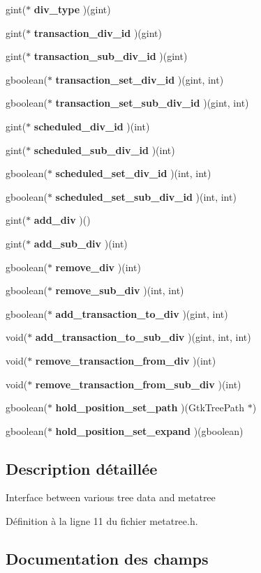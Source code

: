 \begin{DoxyCompactItemize}
gint($\ast$ {\bf div\_\-type} )(gint)
\item 
gint($\ast$ {\bf transaction\_\-div\_\-id} )(gint)
\item 
gint($\ast$ {\bf transaction\_\-sub\_\-div\_\-id} )(gint)
\item 
gboolean($\ast$ {\bf transaction\_\-set\_\-div\_\-id} )(gint, int)
\item 
gboolean($\ast$ {\bf transaction\_\-set\_\-sub\_\-div\_\-id} )(gint, int)
\item 
gint($\ast$ {\bf scheduled\_\-div\_\-id} )(int)
\item 
gint($\ast$ {\bf scheduled\_\-sub\_\-div\_\-id} )(int)
\item 
gboolean($\ast$ {\bf scheduled\_\-set\_\-div\_\-id} )(int, int)
\item 
gboolean($\ast$ {\bf scheduled\_\-set\_\-sub\_\-div\_\-id} )(int, int)
\item 
gint($\ast$ {\bf add\_\-div} )()
\item 
gint($\ast$ {\bf add\_\-sub\_\-div} )(int)
\item 
gboolean($\ast$ {\bf remove\_\-div} )(int)
\item 
gboolean($\ast$ {\bf remove\_\-sub\_\-div} )(int, int)
\item 
gboolean($\ast$ {\bf add\_\-transaction\_\-to\_\-div} )(gint, int)
\item 
void($\ast$ {\bf add\_\-transaction\_\-to\_\-sub\_\-div} )(gint, int, int)
\item 
void($\ast$ {\bf remove\_\-transaction\_\-from\_\-div} )(int)
\item 
void($\ast$ {\bf remove\_\-transaction\_\-from\_\-sub\_\-div} )(int)
\item 
gboolean($\ast$ {\bf hold\_\-position\_\-set\_\-path} )(GtkTreePath $\ast$)
\item 
gboolean($\ast$ {\bf hold\_\-position\_\-set\_\-expand} )(gboolean)
\end{DoxyCompactItemize}


\subsection{Description détaillée}
Interface between various tree data and metatree 

Définition à la ligne 11 du fichier metatree.h.



\subsection{Documentation des champs}
